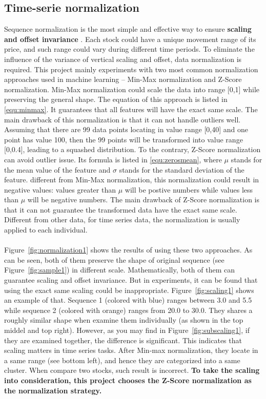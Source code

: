 \subsection{Time-serie normalization}
\label{sec:normalization}
Sequence normalization is the most simple and effective way to ensure \textbf{scaling and offset invariance} \cite{batista2014cid}. Each stock could have a unique movement range of its price, and such range could vary during different time periods. To eliminate the influence of the variance of vertical scaling and offset, data normalization is required. This project mainly experiments with two most common normalization approaches used in machine learning -- Min-Max normalization and Z-Score normalization. Min-Max normalization could scale the data into range [0,1] while preserving the general shape. The equation of this approach is listed in \ref{equ:minmax}. It guarantees that all features will have the exact same scale. The main drawback of this normalization is that it can not handle outliers well. Assuming that there are 99 data points locating in value range [0,40] and one point has value 100, then the 99 points will be transformed into value range [0,0.4], leading to a squashed distribution. To the contrary, Z-Score normalization can avoid outlier issue. Its formula is listed in \ref{equ:zerosmean}, where $\mu$ stands for the mean value of the feature and $\sigma$ stands for the standard deviation of the feature. different from Min-Max normalization, this normalization could result in negative values: values greater than $\mu$ will be postive numbers while values less than $\mu$ will be negative numbers. The main drawback of Z-Score normalization is that it can not guarantee the transformed data have the exact same scale. Different from other data, for time series data, the normalization is usually applied to each individual.\\
\\Figure~\ref{fig:normalization1} shows the results of using these two approaches. As can be seen, both of them preserve the shape of original sequence (see Figure~\ref{fig:sample1}) in different scale. Mathematically, both of them can guarantee scaling and offset invariance. But in experiments, it can be found that using the exact same scaling could be inappropriate. Figure~\ref{fig:scaling1} shows an example of that. Sequence 1 (colored with blue) ranges between 3.0 and 5.5 while sequence 2 (colored with orange) ranges from 20.0 to 30.0. They shares a roughly similar shape when examine them individually (as shown in the top middel and top right). However, as you may find in Figure~\ref{fig:subscaling1}, if they are examined together, the difference is significant. This indicates that scaling matters in time series tasks. After Min-max normalization, they locate in a same range (see bottom left), and hence they are categorized into a same cluster. When compare two stocks, such result is incorrect. \textbf{To take the scaling into consideration, this project chooses the Z-Score normalization as the normalization strategy.}

